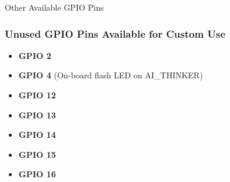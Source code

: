 \documentclass{beamer}
\begin{document}
\begin{frame}{Other Available GPIO Pins}
  \frametitle{Unused GPIO Pins Available for Custom Use}
  \begin{itemize}
    \item \textbf{GPIO 2}
    \item \textbf{GPIO 4} (On-board flash LED on AI\_THINKER)
    \item \textbf{GPIO 12}
    \item \textbf{GPIO 13}
    \item \textbf{GPIO 14}
    \item \textbf{GPIO 15}
    \item \textbf{GPIO 16}
  \end{itemize}
\end{frame}
\end{document}
